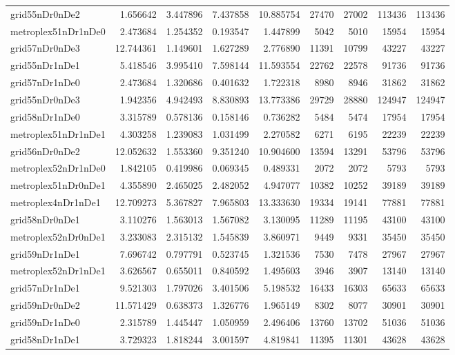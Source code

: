 \begin{longtable}{|l|r|r|r|r|r|r|r|r|}
grid55nDr0nDe2 & 1.656642 & 3.447896 & 7.437858 & 10.885754 & 27470 & 27002 & 113436 & 113436 \\
metroplex51nDr1nDe0 & 2.473684 & 1.254352 & 0.193547 & 1.447899 & 5042 & 5010 & 15954 & 15954 \\
grid57nDr0nDe3 & 12.744361 & 1.149601 & 1.627289 & 2.776890 & 11391 & 10799 & 43227 & 43227 \\
grid55nDr1nDe1 & 5.418546 & 3.995410 & 7.598144 & 11.593554 & 22762 & 22578 & 91736 & 91736 \\
grid57nDr1nDe0 & 2.473684 & 1.320686 & 0.401632 & 1.722318 & 8980 & 8946 & 31862 & 31862 \\
grid55nDr0nDe3 & 1.942356 & 4.942493 & 8.830893 & 13.773386 & 29729 & 28880 & 124947 & 124947 \\
grid58nDr1nDe0 & 3.315789 & 0.578136 & 0.158146 & 0.736282 & 5484 & 5474 & 17954 & 17954 \\
metroplex51nDr1nDe1 & 4.303258 & 1.239083 & 1.031499 & 2.270582 & 6271 & 6195 & 22239 & 22239 \\
grid56nDr0nDe2 & 12.052632 & 1.553360 & 9.351240 & 10.904600 & 13594 & 13291 & 53796 & 53796 \\
metroplex52nDr1nDe0 & 1.842105 & 0.419986 & 0.069345 & 0.489331 & 2072 & 2072 & 5793 & 5793 \\
metroplex51nDr0nDe1 & 4.355890 & 2.465025 & 2.482052 & 4.947077 & 10382 & 10252 & 39189 & 39189 \\
metroplex4nDr1nDe1 & 12.709273 & 5.367827 & 7.965803 & 13.333630 & 19334 & 19141 & 77881 & 77881 \\
grid58nDr0nDe1 & 3.110276 & 1.563013 & 1.567082 & 3.130095 & 11289 & 11195 & 43100 & 43100 \\
metroplex52nDr0nDe1 & 3.233083 & 2.315132 & 1.545839 & 3.860971 & 9449 & 9331 & 35450 & 35450 \\
grid59nDr1nDe1 & 7.696742 & 0.797791 & 0.523745 & 1.321536 & 7530 & 7478 & 27967 & 27967 \\
metroplex52nDr1nDe1 & 3.626567 & 0.655011 & 0.840592 & 1.495603 & 3946 & 3907 & 13140 & 13140 \\
grid57nDr1nDe1 & 9.521303 & 1.797026 & 3.401506 & 5.198532 & 16433 & 16303 & 65633 & 65633 \\
grid59nDr0nDe2 & 11.571429 & 0.638373 & 1.326776 & 1.965149 & 8302 & 8077 & 30901 & 30901 \\
grid59nDr1nDe0 & 2.315789 & 1.445447 & 1.050959 & 2.496406 & 13760 & 13702 & 51036 & 51036 \\
grid58nDr1nDe1 & 3.729323 & 1.818244 & 3.001597 & 4.819841 & 11395 & 11301 & 43628 & 43628 \\

\end{longtable}
